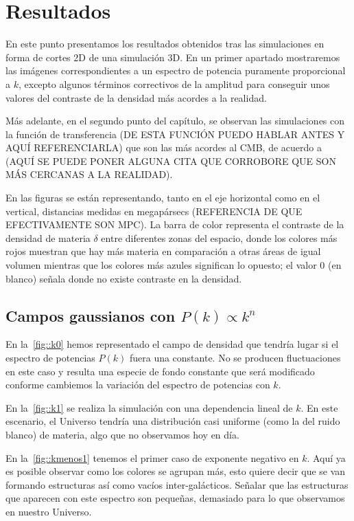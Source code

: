 \chapter{Resultados}
En este punto presentamos los resultados obtenidos tras las simulaciones en forma de cortes 2D de una simulación 3D. En un primer apartado mostraremos las imágenes correspondientes a un espectro de potencia puramente proporcional a \(k\), excepto algunos términos correctivos de la amplitud para conseguir unos valores del contraste de la densidad más acordes a la realidad.

Más adelante, en el segundo punto del capítulo, se observan las simulaciones con la función de transferencia (DE ESTA FUNCIÓN PUEDO HABLAR ANTES Y AQUÍ REFERENCIARLA) que son las más acordes al CMB, de acuerdo a (AQUÍ SE PUEDE PONER ALGUNA CITA QUE CORROBORE QUE SON MÁS CERCANAS A LA REALIDAD).

En las figuras se están representando, tanto en el eje horizontal como en el vertical, distancias medidas en megapársecs (REFERENCIA DE QUE EFECTIVAMENTE SON MPC). La barra de color representa el contraste de la densidad de materia \(\delta\) entre diferentes zonas del espacio, donde los colores más rojos muestran que hay más materia en comparación a otras áreas de igual volumen mientras que los colores más azules significan lo opuesto; el valor 0 (en blanco) señala donde no existe contraste en la densidad.

\section{Campos gaussianos con \texorpdfstring{\(P(k)\propto k^n\)}{espectro de potencias proporcional a una potencia de k}}
En la~\autoref{fig::k0} hemos representado el campo de densidad que tendría lugar si el espectro de potencias \(P(k)\) fuera una constante. No se producen fluctuaciones en este caso y resulta una especie de fondo constante que será modificado conforme cambiemos la variación del espectro de potencias con \(k\).

En la~\autoref{fig::k1} se realiza la simulación con una dependencia lineal de \(k\). En este escenario, el Universo tendría una distribución casi uniforme (como la del ruido blanco) de materia, algo que no observamos hoy en día.

En la~\autoref{fig::kmenos1} tenemos el primer caso de exponente negativo en \(k\). Aquí ya es posible observar como los colores se agrupan más, esto quiere decir que se van formando estructuras así como vacíos inter-galácticos. Señalar que las estructuras que aparecen con este espectro son pequeñas, demasiado para lo que observamos en nuestro Universo.

